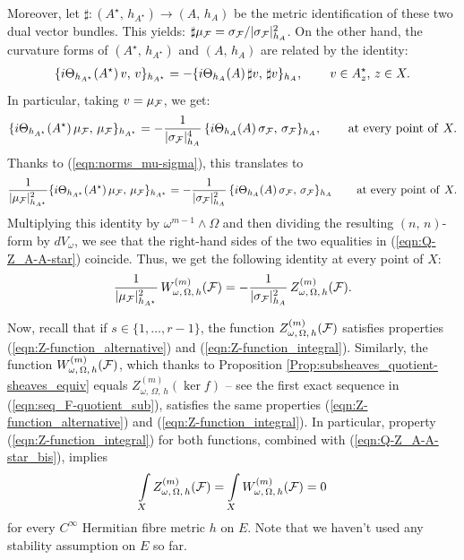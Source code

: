 \documentclass[12pt]{article}
\begin{document}
Moreover, let $\sharp:(A^\star,\,h_{A^\star})\longrightarrow(A,\,h_A)$ be the metric identification of these two dual vector bundles. This yields: $\sharp\mu_{\cal F} = \sigma_{\cal F}/|\sigma_{\cal F}|_{h_A}^2$. On the other hand, the curvature forms of $(A^\star,\,h_{A^\star})$ and $(A,\,h_A)$ are related by the identity: \begin{eqnarray*}\{i\Theta_{h_{A^\star}}(A^\star)\,v,\,v\}_{h_{A^\star}} = -\{i\Theta_{h_A}(A)\,\sharp v,\,\sharp v\}_{h_A},   \hspace{5ex} v\in A^\star_z,\,z\in X.\end{eqnarray*} In particular, taking $v=\mu_{\cal F}$, we get: \begin{eqnarray*}\{i\Theta_{h_{A^\star}}(A^\star)\,\mu_{\cal F},\,\mu_{\cal F}\}_{h_{A^\star}} = -\frac{1}{|\sigma_{\cal F}|_{h_A}^4}\,\{i\Theta_{h_A}(A)\,\sigma_{\cal F},\,\sigma_{\cal F}\}_{h_A}, \hspace{5ex} \mbox{at every point of}\hspace{1ex} X.\end{eqnarray*} Thanks to (\ref{eqn:norms_mu-sigma}), this translates to \begin{eqnarray*}\frac{1}{|\mu_{\cal F}|_{h_{A^\star}}^2}\{i\Theta_{h_{A^\star}}(A^\star)\,\mu_{\cal F},\,\mu_{\cal F}\}_{h_{A^\star}} = -\frac{1}{|\sigma_{\cal F}|_{h_A}^2}\,\{i\Theta_{h_A}(A)\,\sigma_{\cal F},\,\sigma_{\cal F}\}_{h_A} \hspace{5ex} \mbox{at every point of}\hspace{1ex} X.\end{eqnarray*} Multiplying this identity by $\omega^{m-1}\wedge\Omega$ and then dividing the resulting $(n,\,n)$-form by $dV_\omega$, we see that the right-hand sides of the two equalities in (\ref{eqn:Q-Z_A-A-star}) coincide. Thus, we get the following identity at every point of $X$: \begin{eqnarray}\label{eqn:Q-Z_A-A-star_bis}\frac{1}{|\mu_{\cal F}|_{h_{A^\star}}^2}\,W_{\omega,\,\Omega,\,h}^{(m)}({\cal F}) = -\frac{1}{|\sigma_{\cal F}|_{h_A}^2}\,Z_{\omega,\,\Omega,\,h}^{(m)}({\cal F}).\end{eqnarray}

Now, recall that if $s\in\{1,\dots , r-1\}$, the function $Z_{\omega,\,\Omega,\,h}^{(m)}({\cal F})$ satisfies properties (\ref{eqn:Z-function_alternative}) and (\ref{eqn:Z-function_integral}). Similarly, the function $W_{\omega,\,\Omega,\,h}^{(m)}({\cal F})$, which thanks to Proposition \ref{Prop:subsheaves_quotient-sheaves_equiv} equals $Z_{\omega,\,\Omega,\,h}^{(m)}(\ker f)$ -- see the first exact sequence in (\ref{eqn:seq_F-quotient_sub}), satisfies the same properties (\ref{eqn:Z-function_alternative}) and (\ref{eqn:Z-function_integral}). In particular, property (\ref{eqn:Z-function_integral}) for both functions, combined with (\ref{eqn:Q-Z_A-A-star_bis}), implies \begin{eqnarray}\label{eqn:integrals_Z-Q_zero}\int\limits_XZ_{\omega,\,\Omega,\,h}^{(m)}({\cal F}) = \int\limits_XW_{\omega,\,\Omega,\,h}^{(m)}({\cal F}) =0\end{eqnarray} for every $C^\infty$ Hermitian fibre metric $h$ on $E$. Note that we haven't used any stability assumption on $E$ so far.
\end{document}
